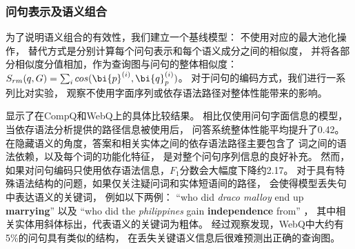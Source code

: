 

\subsubsection{问句表示及语义组合}
为了说明语义组合的有效性，我们建立一个基线模型：
不使用对应的最大池化操作，
替代方式是分别计算每个问句表示和每个语义成分之间的相似度，
并将各部分相似度分值相加，作为查询图与问句的整体相似度：
$S_{rm}(q, G) = \sum_{i}{cos(\bi{p}^{(i)}, \bi{q}_p^{(i)})}$。
对于问句的编码方式，我们进行一系列比对实验，
观察不使用字面序列或依存语法路径对整体性能带来的影响。


显示了在CompQ和WebQ上的具体比较结果。
相比仅使用问句字面信息的模型，当依存语法分析提供的路径信息被使用后，
问答系统整体性能平均提升了0.42。
在隐藏语义的角度，答案和相关实体之间的依存语法路径主要包含了
词之间的语法依赖，以及每个词的功能化特征，
是对整个问句序列信息的良好补充。
然而，如果对问句编码只使用依存语法信息，$F_1$分数会大幅度下降约2.17。
对于具有特殊语法结构的问题，如果仅关注疑问词和实体短语间的路径，
会使得模型丢失句中表达语义的关键词，
例如以下两例：
``who did \textit{draco malloy} end up \textbf{marrying}'' 以及
``who did the \textit{philippines} gain \textbf{independence} from'' ，
其中相关实体用斜体标出，代表语义的关键词为粗体。
经过观察发现，WebQ中大约有5\%的问句具有类似的结构，
在丢失关键语义信息后很难预测出正确的查询图。


